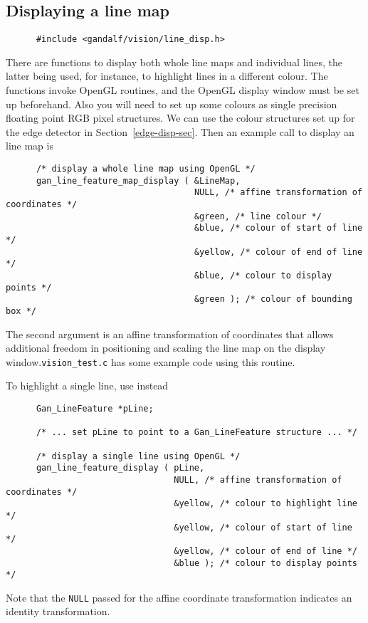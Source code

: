 \subsection{Displaying a line map}
\begin{verbatim}
      #include <gandalf/vision/line_disp.h>
\end{verbatim}
There are functions to display both whole line maps and individual lines,
the latter being used, for instance, to highlight lines in a different
colour. The functions invoke OpenGL routines, and the OpenGL display window
must be set up beforehand. Also you will need to set up some colours as single
precision floating point RGB pixel structures. We can use the colour
structures set up for the edge detector in Section~\ref{edge-disp-sec}.
Then an example call to display an line map is
\begin{verbatim}
      /* display a whole line map using OpenGL */
      gan_line_feature_map_display ( &LineMap,
                                     NULL, /* affine transformation of coordinates */
                                     &green, /* line colour */
                                     &blue, /* colour of start of line */
                                     &yellow, /* colour of end of line */
                                     &blue, /* colour to display points */
                                     &green ); /* colour of bounding box */
\end{verbatim}
The second argument is an affine transformation
of coordinates that allows additional freedom in positioning and scaling
the line map on the display window.{\tt vision\_test.c} has some example code
using this routine.

To highlight a single line, use instead
\begin{verbatim}
      Gan_LineFeature *pLine;

      /* ... set pLine to point to a Gan_LineFeature structure ... */

      /* display a single line using OpenGL */
      gan_line_feature_display ( pLine,
                                 NULL, /* affine transformation of coordinates */
                                 &yellow, /* colour to highlight line */
                                 &yellow, /* colour of start of line */
                                 &yellow, /* colour of end of line */
                                 &blue ); /* colour to display points */
\end{verbatim}
Note that the {\tt NULL} passed for the affine coordinate transformation
indicates an identity transformation.

